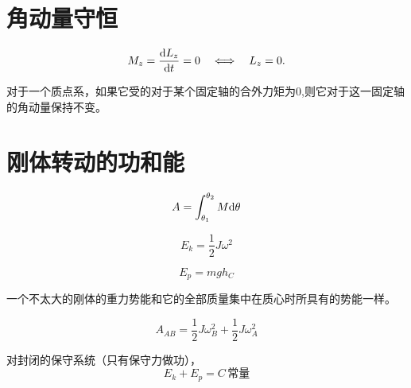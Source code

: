 \section{角动量守恒}
\begin{equation}
M_z=\frac{{\rm{d}} L_z}{{\rm{d}} t} = 0 \quad  \Longleftrightarrow \quad L_z=0.
\end{equation}
\par 对于一个质点系，如果它受的对于某个固定轴的合外力矩为0,则它对于这一固定轴的角动量保持不变。

\section{刚体转动的功和能}
\begin{equation}
A=\int_{\theta_1}^{\theta_2}M{\rm{d}} \theta 
\end{equation}

\begin{equation}
E_k=\frac{1}{2}J\omega^2
\end{equation}

\begin{equation}
E_p=mgh_C
\end{equation}
\par 一个不太大的刚体的重力势能和它的全部质量集中在质心时所具有的势能一样。\jg\jg 

\begin{equation}
A_{AB}=\frac{1}{2}J\omega_B^2+\frac{1}{2}J\omega_A^2
\end{equation}


对封闭的保守系统（只有保守力做功），
\begin{equation}
E_k+E_p=C\,\mbox{常量}
\end{equation}

